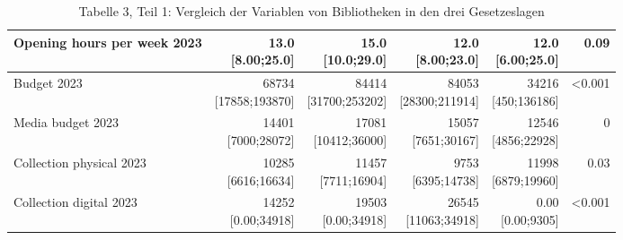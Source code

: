 \documentclass[a4paper,
fontsize=11pt,
oneside,
numbers=noperiodatend,
parskip=half-,
bibliography=totoc,
final
]{scrartcl}
\begin{document}
\begin{landscape}
\begin{table}[]
\begin{tabular}{lrrrrr}
Opening hours per week 2023      & \makecell{13.0 \\ {[}8.00;25.0{]}}     & \makecell{15.0 \\ {[}10.0;29.0{]}}     & \makecell{12.0 \\ {[}8.00;23.0{]}}     & \makecell{12.0 \\ {[}6.00;25.0{]}}   & 0.09               \\ \hline
Budget 2023                      & \makecell{68734 \\ {[}17858;193870{]}} & \makecell{84414 \\ {[}31700;253202{]}} & \makecell{84053 \\ {[}28300;211914{]}} & \makecell{34216 \\ {[}450;136186{]}} & \textless{}0.001   \\ \hline
Media budget 2023                & \makecell{14401 \\ {[}7000;28072{]}}   & \makecell{17081 \\ {[}10412;36000{]}}  & \makecell{15057 \\ {[}7651;30167{]}}   & \makecell{12546 \\ {[}4856;22928{]}} & 0                  \\ \hline
Collection physical 2023         & \makecell{10285 \\ {[}6616;16634{]}}   & \makecell{11457 \\ {[}7711;16904{]}}   & \makecell{9753 \\ {[}6395;14738{]}}    & \makecell{11998 \\ {[}6879;19960{]}} & 0.03               \\ \hline
Collection digital 2023          & \makecell{14252 \\ {[}0.00;34918{]}}   & \makecell{19503 \\ {[}0.00;34918{]}}   & \makecell{26545 \\ {[}11063;34918{]}}  & \makecell{0.00 \\ {[}0.00;9305{]}}   & \textless{}0.001   \\ \hline
\end{tabular}
\caption{Tabelle 3, Teil 1: Vergleich der Variablen von Bibliotheken in den drei Gesetzeslagen}
\end{table}
\end{landscape}
\end{document}
